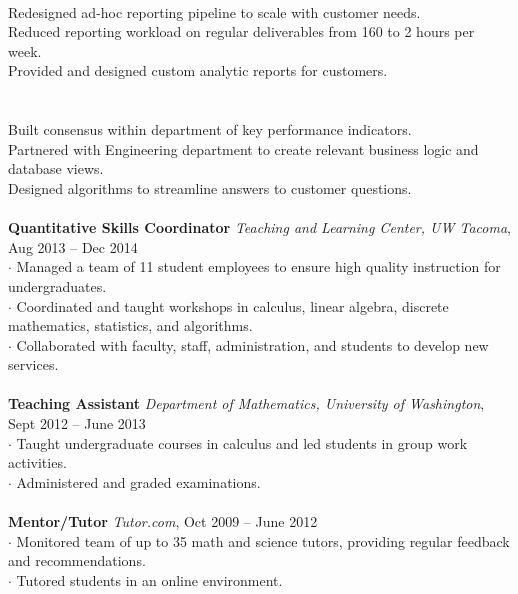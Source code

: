 \documentclass[letterpaper, onecolumn, oneside]{article}
\newcommand{\dotindent}{\hspace*{.25in}$\cdot$ }
\newcommand{\dotindentindent}{\hspace*{.5in}}
\newcommand{\spaceindent}{\hspace*{0.25in}}
\begin{document}
\begin{flushleft}
\spaceindent {\bf Reporting Pipelines} \\
\dotindentindent Redesigned ad-hoc reporting pipeline to scale with customer needs.\\
\dotindentindent Reduced reporting workload on regular deliverables from 160 to 2 hours per week.\\
\dotindentindent Provided and designed custom analytic reports for customers.\\
~\\

\spaceindent {\bf Analytic Infrastructure} \\
\dotindentindent Built consensus within department of key performance indicators.\\
\dotindentindent Partnered with Engineering department to create relevant business logic and database views.\\
\dotindentindent Designed algorithms to streamline answers to customer questions.\\
~\\


\textbf{\large Quantitative Skills Coordinator} \emph{Teaching and Learning Center, UW Tacoma}, Aug 2013 -- Dec 2014 \\
\dotindent Managed a team of 11 student employees to ensure high quality instruction for undergraduates. \\
\dotindent Coordinated and taught workshops in calculus, linear algebra, discrete mathematics, statistics, and algorithms.\\
\dotindent Collaborated with faculty, staff, administration, and students to develop new services.\\
~\\

\textbf{\large Teaching Assistant} \emph{Department of Mathematics, University of Washington}, Sept 2012 -- June 2013 \\
\dotindent Taught undergraduate courses in calculus and led students in group work activities.  \\
\dotindent  Administered and graded examinations.\\
~\\

\textbf{\large Mentor/Tutor} \emph{Tutor.com}, Oct 2009 -- June 2012 \\
\dotindent  Monitored team of up to 35 math and science tutors, providing regular feedback and recommendations.\\
\dotindent  Tutored students in an online environment.\\ 
~\\


\end{flushleft}
\end{document}
